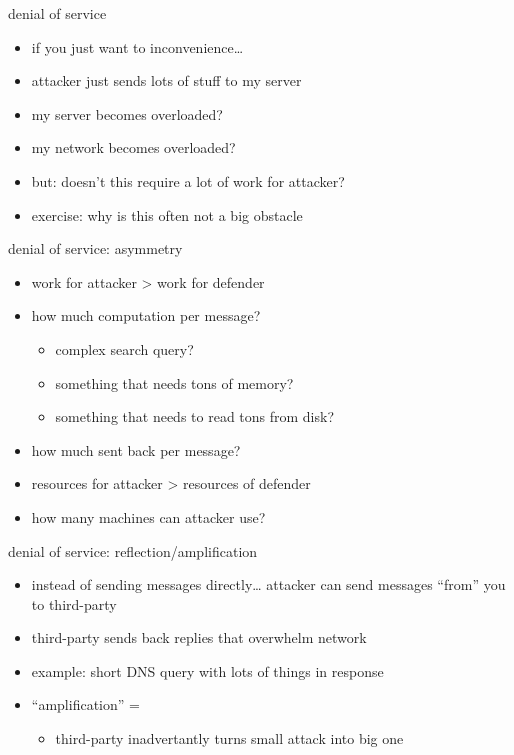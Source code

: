 \begin{frame}{denial of service}
    \begin{itemize}
    \item if you just want to inconvenience\ldots
    \item attacker just sends lots of stuff to my server
    \item my server becomes overloaded?
    \item my network becomes overloaded?
    \vspace{.5cm}
    \item but: doesn't this require a lot of work for attacker?
    \item exercise: why is this often not a big obstacle
    \end{itemize}
\end{frame}

\begin{frame}{denial of service: asymmetry}
    \begin{itemize}
    \item work for attacker > work for defender
    \item how much computation per message?
        \begin{itemize}
        \item complex search query?
        \item something that needs tons of memory?
        \item something that needs to read tons from disk?
        \end{itemize}
    \item how much sent back per message?
    \vspace{.5cm}
    \item resources for attacker > resources of defender
    \item how many machines can attacker use?
    \end{itemize}
\end{frame}

\begin{frame}{denial of service: reflection/amplification}
    \begin{itemize}
    \item instead of sending messages directly\ldots
        attacker can send messages ``from'' you to third-party
    \item third-party sends back replies that overwhelm network
    \item example: short DNS query with lots of things in response
    \vspace{.5cm}
    \item ``amplification'' =
        \begin{itemize}
        \item third-party inadvertantly turns small attack into big one
        \end{itemize}
    \end{itemize}    
\end{frame} 

